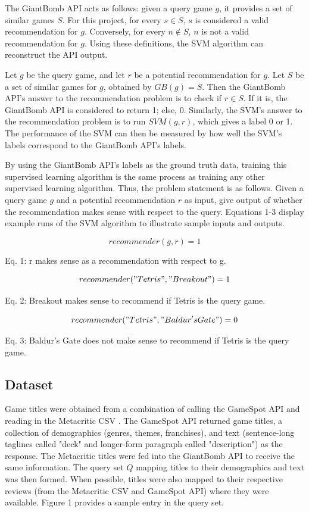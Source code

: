 \documentclass[10pt,twocolumn]{article}
\begin{document}
The GiantBomb API acts as follows: given a query game $g$, it provides a set of similar games $S$. For this project, for every $s \in S$, $s$ is considered a valid recommendation for $g$. Conversely, for every $n \not\in S$, $n$ is not a valid recommendation for $g$. Using these definitions, the SVM algorithm can reconstruct the API output. 

Let $g$ be the query game, and let $r$ be a potential recommendation for $g$. Let $S$ be a set of similar games for $g$, obtained by $GB(g) = S$. Then the GiantBomb API's answer to the recommendation problem is to check if $r \in S$. If it is, the GiantBomb API is considered to return 1; else, 0. Similarly, the SVM's answer to the recommendation problem is to run $SVM(g, r)$, which gives a label 0 or 1. The performance of the SVM can then be measured by how well the SVM's labels correspond to the GiantBomb API's labels.

By using the GiantBomb API's labels as the ground truth data, training this supervised learning algorithm is the same process as training any other supervised learning algorithm. Thus, the problem statement is as follows. Given a query game $g$ and a potential recommendation $r$ as input, give output of whether the recommendation makes sense with respect to the query. Equations 1-3 display example runs of the SVM algorithm to illustrate sample inputs and outputs.

\begin{equation}
    recommender(g, r) = 1
\end{equation}

Eq. 1: r makes sense as a recommendation with respect to g.

\begin{equation}
    recommender("Tetris", "Breakout") = 1
\end{equation}

Eq. 2: Breakout makes sense to recommend if Tetris is the query game.

\begin{equation}
    recommender("Tetris", "Baldur's Gate") = 0
\end{equation}

Eq. 3: Baldur's Gate does not make sense to recommend if Tetris is the query game.

\subsection{Dataset}

Game titles were obtained from a combination of calling the GameSpot API \cite{GameSpot} and reading in the Metacritic CSV \cite{KaggleMetacritic}. The GameSpot API returned game titles, a collection of demographics (genres, themes, franchises), and text (sentence-long taglines called "deck" and longer-form paragraph called "description") as the response. The Metacritic titles were fed into the GiantBomb API to receive the same information. The query set $Q$ mapping titles to their demographics and text was then formed. When possible, titles were also mapped to their respective reviews (from the Metacritic CSV and GameSpot API) where they were available. Figure 1 provides a sample entry in the query set.
\end{document}
